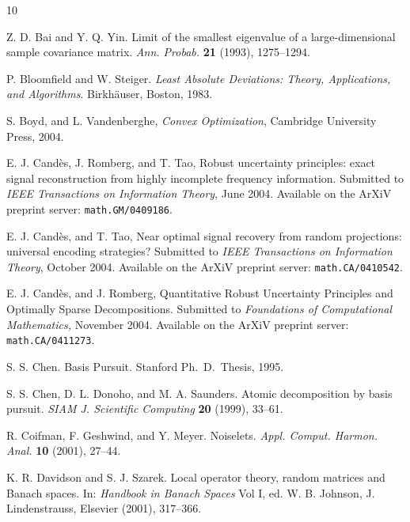 \documentclass[11pt]{article}
\newcommand{\<}{\langle}
\renewcommand{\>}{\rangle}
\numberwithin{equation}{section}
\begin{document}
\begin{thebibliography}{10}
  
 Z. D. Bai and Y. Q. Yin. Limit of the smallest
  eigenvalue of a large-dimensional sample covariance matrix.  {\em Ann.
  Probab.}  {\bf 21} (1993), 1275--1294. 

 P. Bloomfield and W. Steiger. {\em Least Absolute
    Deviations: Theory, Applications, and Algorithms}.  Birkh\"auser,
  Boston, 1983.  

 S. Boyd, and L. Vandenberghe, {\em Convex
    Optimization}, Cambridge University Press, 2004.
  
 E. J. Cand\`es, J. Romberg, and T. Tao, Robust
  uncertainty principles: exact signal reconstruction from highly
  incomplete frequency information. Submitted to {\em IEEE
    Transactions on Information Theory}, June 2004.  Available on the
  ArXiV preprint server: {\tt math.GM/0409186}.
  
 E. J. Cand\`es, and T. Tao, Near optimal
  signal recovery from random projections: universal encoding
  strategies?  Submitted to {\em IEEE Transactions on Information
    Theory}, October 2004. Available on the ArXiV preprint server:
  {\tt math.CA/0410542}.
  
 E. J. Cand\`es, and J. Romberg, Quantitative Robust
  Uncertainty Principles and Optimally Sparse Decompositions.
  Submitted to {\em Foundations of Computational Mathematics,}
  November 2004. Available on the ArXiV preprint server: {\tt
    math.CA/0411273}.
  
  
 S. S. Chen. {Basis Pursuit}. Stanford Ph.~D.~Thesis,
  1995.

 S. S. Chen, D. L. Donoho, and M. A. Saunders. Atomic
  decomposition by basis pursuit. {\em SIAM J. Scientific Computing}
  \textbf{20} (1999), 33--61.
  
 R. Coifman, F. Geshwind, and Y. Meyer. Noiselets.
  {\em Appl. Comput. Harmon. Anal.} {\bf 10} (2001), 27--44.

 K. R. Davidson and S. J. Szarek. Local operator
  theory, random matrices and Banach spaces. In: {\em Handbook in
    Banach Spaces} Vol I, ed.  W. B. Johnson, J. Lindenstrauss,
  Elsevier (2001), 317--366.
  

\end{thebibliography}
\end{document}
